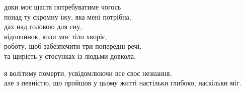 доки моє щастя потребуватиме чогось\\
понад ту скромну їжу, яка мені потрібна,\\
дах над головою для сну,\\
відпочинок, коли моє тіло хворіє,\\
роботу, щоб забезпечити три попередні речі,\\
та щирість у стосунках із людьми довкола,

я волітиму померти, усвідомлюючи все своє незнання,\\
але з певністю, що пройшов у цьому житті настільки глибоко, наскільки міг.

